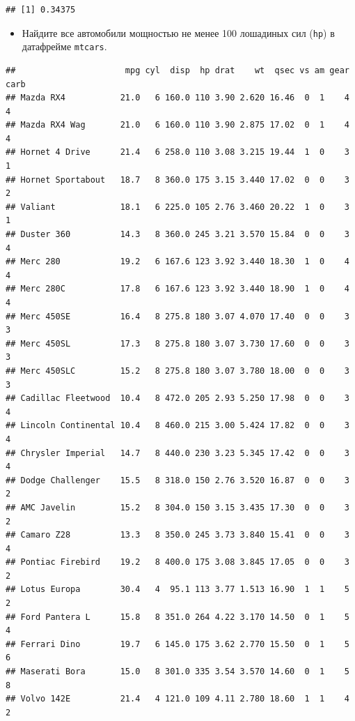 \documentclass[]{book}
\newenvironment{Shaded}{\begin{snugshade}}{\end{snugshade}}
\newcommand{\DecValTok}[1]{\textcolor[rgb]{0.00,0.00,0.81}{#1}}
\newcommand{\StringTok}[1]{\textcolor[rgb]{0.31,0.60,0.02}{#1}}
\newcommand{\OperatorTok}[1]{\textcolor[rgb]{0.81,0.36,0.00}{\textbf{#1}}}
\newcommand{\NormalTok}[1]{#1}
\providecommand{\tightlist}{%
  \setlength{\itemsep}{0pt}\setlength{\parskip}{0pt}}
\begin{document}
\begin{verbatim}
## [1] 0.34375
\end{verbatim}

\begin{itemize}
\tightlist
\item
  Найдите все автомобили мощностью не менее 100 лошадиных сил
  (\texttt{hp}) в датафрейме \texttt{mtcars}.
\end{itemize}

\begin{Shaded}
\end{Shaded}

\begin{verbatim}
##                      mpg cyl  disp  hp drat    wt  qsec vs am gear carb
## Mazda RX4           21.0   6 160.0 110 3.90 2.620 16.46  0  1    4    4
## Mazda RX4 Wag       21.0   6 160.0 110 3.90 2.875 17.02  0  1    4    4
## Hornet 4 Drive      21.4   6 258.0 110 3.08 3.215 19.44  1  0    3    1
## Hornet Sportabout   18.7   8 360.0 175 3.15 3.440 17.02  0  0    3    2
## Valiant             18.1   6 225.0 105 2.76 3.460 20.22  1  0    3    1
## Duster 360          14.3   8 360.0 245 3.21 3.570 15.84  0  0    3    4
## Merc 280            19.2   6 167.6 123 3.92 3.440 18.30  1  0    4    4
## Merc 280C           17.8   6 167.6 123 3.92 3.440 18.90  1  0    4    4
## Merc 450SE          16.4   8 275.8 180 3.07 4.070 17.40  0  0    3    3
## Merc 450SL          17.3   8 275.8 180 3.07 3.730 17.60  0  0    3    3
## Merc 450SLC         15.2   8 275.8 180 3.07 3.780 18.00  0  0    3    3
## Cadillac Fleetwood  10.4   8 472.0 205 2.93 5.250 17.98  0  0    3    4
## Lincoln Continental 10.4   8 460.0 215 3.00 5.424 17.82  0  0    3    4
## Chrysler Imperial   14.7   8 440.0 230 3.23 5.345 17.42  0  0    3    4
## Dodge Challenger    15.5   8 318.0 150 2.76 3.520 16.87  0  0    3    2
## AMC Javelin         15.2   8 304.0 150 3.15 3.435 17.30  0  0    3    2
## Camaro Z28          13.3   8 350.0 245 3.73 3.840 15.41  0  0    3    4
## Pontiac Firebird    19.2   8 400.0 175 3.08 3.845 17.05  0  0    3    2
## Lotus Europa        30.4   4  95.1 113 3.77 1.513 16.90  1  1    5    2
## Ford Pantera L      15.8   8 351.0 264 4.22 3.170 14.50  0  1    5    4
## Ferrari Dino        19.7   6 145.0 175 3.62 2.770 15.50  0  1    5    6
## Maserati Bora       15.0   8 301.0 335 3.54 3.570 14.60  0  1    5    8
## Volvo 142E          21.4   4 121.0 109 4.11 2.780 18.60  1  1    4    2
\end{verbatim}
\end{document}
